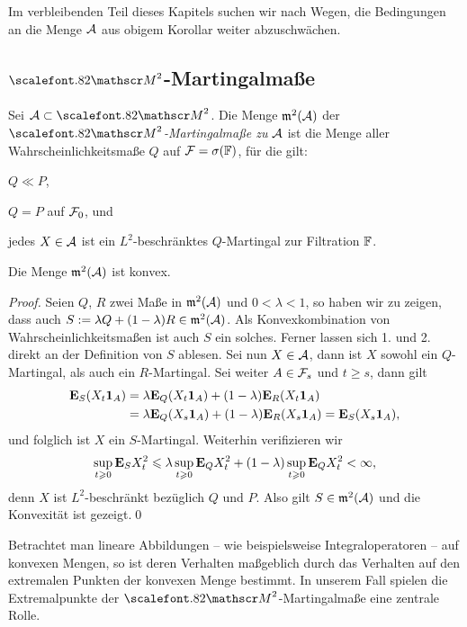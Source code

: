 Im verbleibenden Teil dieses Kapitels suchen wir nach Wegen, die Bedingungen an
die Menge $\AA$ aus obigem Korollar weiter abzuschwächen.

\subsection{$\MM^2$-Martingalmaße} 

\begin{definition}
Sei $\AA \subset \MM^2$. Die Menge \emph{$\m^2(\AA)$} der
\emph{$\MM^2$-Martingalmaße zu $\AA$} ist die Menge aller
Wahrscheinlichkeitsmaße $Q$ auf $\FF=\sigma(\F)$, für die gilt:
\begin{defnenum}
\item $Q \ll P$,
\item $Q=P$ auf $\FF_0$, und
\item jedes $X\in\AA$ ist ein $L^2$-beschränktes $Q$-Martingal zur Filtration
$\F$.\fish
\end{defnenum}
\end{definition}

\begin{lemma}
Die Menge $\m^2(\AA)$ ist konvex.\fish
\end{lemma}
\begin{proof}
Seien $Q$, $R$ zwei Maße in $\m^2(\AA)$ und $0 < \lambda < 1$, so haben wir zu
zeigen, dass auch $S\defl \lambda Q + (1-\lambda)R\in\m^2(\AA)$. Als
Konvexkombination von Wahrscheinlichkeitsmaßen ist auch $S$ ein solches.
Ferner lassen sich 1. und 2. direkt an der Definition von $S$ ablesen. Sei nun
$X\in\AA$, dann ist $X$ sowohl ein $Q$-Martingal, als auch ein $R$-Martingal.
Sei weiter $A\in\FF_s$ und $t\ge s$, dann gilt
\begin{align*}
\E_S(X_t \Id_A) &= \lambda \E_Q(X_t\Id_A) + (1-\lambda)\E_R(X_t\Id_A)\\
&= \lambda \E_Q(X_s\Id_A) + (1-\lambda)\E_R(X_s\Id_A)
= \E_S(X_s \Id_A),
\end{align*}
und folglich ist $X$ ein $S$-Martingal. Weiterhin verifizieren wir
\begin{align*}
\sup_{t\ge 0} \E_S X_t^2 \le
\lambda \sup_{t\ge 0} \E_Q X_t^2
+
(1-\lambda) \sup_{t\ge 0} \E_Q X_t^2
< \infty,
\end{align*}
denn $X$ ist $L^2$-beschränkt bezüglich $Q$ und $P$. Also gilt $S\in\m^2(\AA)$
und die Konvexität ist gezeigt.\qed
\end{proof}

Betrachtet man lineare Abbildungen -- wie beispielsweise Integraloperatoren --
auf konvexen Mengen, so ist deren Verhalten maßgeblich durch das Verhalten
auf den extremalen Punkten der konvexen Menge bestimmt. In unserem Fall
spielen die Extremalpunkte der $\MM^2$-Martingalmaße eine zentrale
Rolle.

